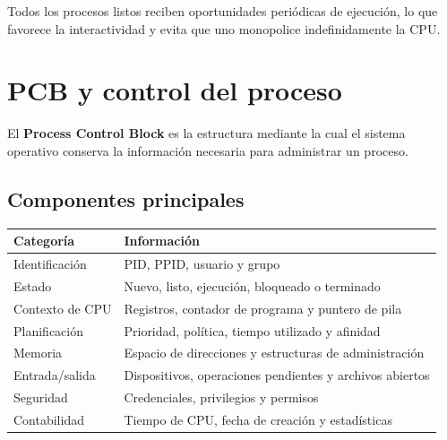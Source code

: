 \documentclass[
  spanish,
  letterpaper,
]{scrbook}
\newcounter{none} %
\begin{document}
\begin{tcolorbox}[enhanced jigsaw, arc=.35mm, bottomrule=.15mm, bottomtitle=1mm, breakable, colback=white, colbacktitle=quarto-callout-tip-color!10!white, colframe=quarto-callout-tip-color-frame, coltitle=black, left=2mm, leftrule=.75mm, opacityback=0, opacitybacktitle=0.6, rightrule=.15mm, title=\textcolor{quarto-callout-tip-color}{\faLightbulb}\hspace{0.5em}{Ventaja de Round Robin}, titlerule=0mm, toprule=.15mm, toptitle=1mm]

Todos los procesos listos reciben oportunidades periódicas de ejecución,
lo que favorece la interactividad y evita que uno monopolice
indefinidamente la CPU.

\end{tcolorbox}


\chapter{PCB y control del proceso}\label{pcb-y-control-del-proceso}

El \textbf{Process Control Block} es la estructura mediante la cual el
sistema operativo conserva la información necesaria para administrar un
proceso.

\section{Componentes principales}\label{componentes-principales}

{\def\LTcaptype{none} %
\begin{longtable}[]{@{}
  >{\raggedright\arraybackslash}p{}
  >{\raggedright\arraybackslash}p{}@{}}
\toprule\noalign{}
\begin{minipage}[b]{\linewidth}\raggedright
Categoría
\end{minipage} & \begin{minipage}[b]{\linewidth}\raggedright
Información
\end{minipage} \\
\midrule\noalign{}
\endhead
\bottomrule\noalign{}
\endlastfoot
Identificación & PID, PPID, usuario y grupo \\
Estado & Nuevo, listo, ejecución, bloqueado o terminado \\
Contexto de CPU & Registros, contador de programa y puntero de pila \\
Planificación & Prioridad, política, tiempo utilizado y afinidad \\
Memoria & Espacio de direcciones y estructuras de administración \\
Entrada/salida & Dispositivos, operaciones pendientes y archivos
abiertos \\
Seguridad & Credenciales, privilegios y permisos \\
Contabilidad & Tiempo de CPU, fecha de creación y estadísticas \\
\end{longtable}
}
\end{document}
